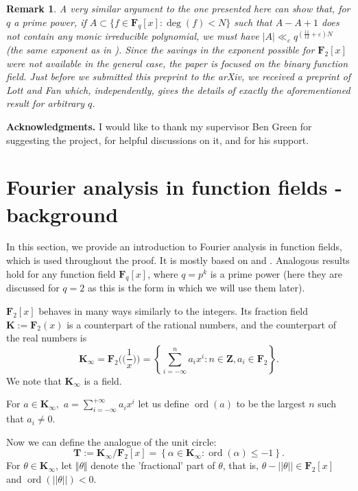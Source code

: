 \documentclass[11pt, reqno]{amsart}
\newtheorem*{remark}{Remark}
\numberwithin{equation}{section}
\newcommand\eps{\varepsilon}
\newcommand\ord{\operatorname{ord}}
\begin{document}
\begin{remark}
\normalfont
    A very similar argument to the one presented here can show that, for $q$ a prime power, if $A \subset \{f \in \mathbf{F}_q[x]: \deg(f) < N\}$ such that $A-A+1$ does not contain any monic irreducible polynomial, we must have $|A| \ll_{\eps} q^{(\frac{11}{12}+\eps)N}$ (the same exponent as in \cite{original}). Since the savings in the exponent possible for $\mathbf{F}_2[x]$ were not available in the general case, the paper is focused on the binary function field. Just before we submitted this preprint to the arXiv, we received a preprint of Lott and Fan which, independently, gives the details of exactly the aforementioned result for arbitrary $q$.
\end{remark}

\textbf{Acknowledgments.} I would like to thank my supervisor Ben Green for suggesting the project, for helpful discussions on it, and for his support. 

\section{Fourier analysis in function fields - background}
\label{section_fourier}

In this section, we provide an introduction to Fourier analysis in function fields, which is used throughout the proof.
It is mostly based on \cite{cubics} and \cite{waring_function_fields}. Analogous results hold for any function field $\mathbf{F}_q[x]$, where $q=p^k$ is a prime power (here they are discussed for $q=2$ as this is the form in which we will use them later).

$\mathbf{F}_2[x]$ behaves in many ways similarly to the integers. Its fraction field $\mathbf{K} := \mathbf{F}_2(x)$ is a counterpart of the rational numbers, and the counterpart of the real numbers is
\begin{equation}
\label{k_infty}
    \mathbf{K}_{\infty}=\mathbf{F}_2\Big(\Big(\frac{1}{x}\Big)\Big)=\left\{ \sum_{i=-\infty}^{n} a_ix^i : n \in \mathbf{Z}, a_i \in \mathbf{F}_2 \right\}.
\end{equation}
We note that $\mathbf{K}_{\infty}$ is a field.

For $a \in \mathbf{K}_{\infty},$ $a=\sum_{i=-\infty}^{+\infty} a_ix^i$ let us define $\ord(a)$ to be the largest $n$ such that $a_i \neq 0$.

Now we can define the analogue of the unit circle:
\begin{equation}
\label{t_circle}
    \mathbf{T}:=\mathbf{K}_{\infty}\big/\mathbf{F}_2[x]=\left\{ \alpha \in \mathbf{K}_{\infty} : \ord(\alpha) \leqslant -1 \right\}.
\end{equation}
For $\theta \in \mathbf{K}_{\infty}$, let $\Vert \theta \Vert$ denote the 'fractional' part of $\theta$, that is, $\theta-||\theta|| \in \mathbf{F}_2[x]$ and $\ord(||\theta||) < 0$.
\end{document}
